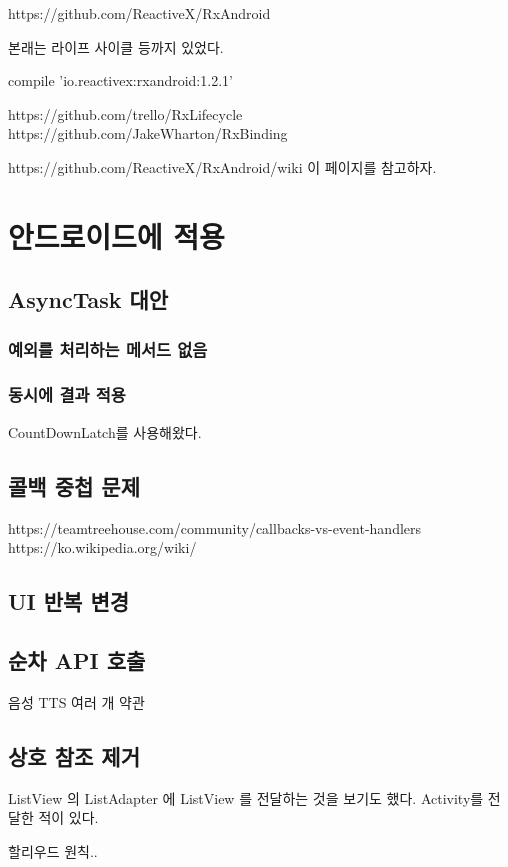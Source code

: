 \documentclass{book}
\begin{document}
https://github.com/ReactiveX/RxAndroid

본래는 라이프 사이클 등까지 있었다.


compile 'io.reactivex:rxandroid:1.2.1' 



https://github.com/trello/RxLifecycle
https://github.com/JakeWharton/RxBinding

https://github.com/ReactiveX/RxAndroid/wiki 이 페이지를 참고하자.

\chapter{안드로이드에 적용}
\section{AsyncTask 대안}
\subsection{예외를 처리하는 메서드 없음}


\subsection{동시에 결과 적용}
CountDownLatch를 사용해왔다.

\section{콜백 중첩 문제}
https://teamtreehouse.com/community/callbacks-vs-event-handlers
https://ko.wikipedia.org/wiki/%

\section{UI 반복 변경}

\section{순차 API 호출}
음성 TTS
여러 개 약관

\section{상호 참조 제거}
ListView 의 ListAdapter 에 ListView 를 전달하는 것을 보기도 했다.
Activity를 전달한 적이 있다.


할리우드 원칙..
\end{document}
